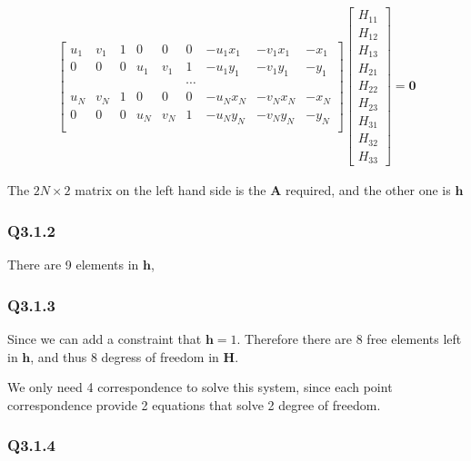 \documentclass[11pt]{article}
\begin{document}
\begin{align}
    \begin{bmatrix}
        u_{1} & v_{1} & 1 & 0 & 0 & 0 & -u_{1} x_{1} & -v_{1} x_{1} & -x_{1} \\
        0 & 0 & 0 & u_{1} & v_{1} & 1 & -u_{1} y_{1} & -v_{1} y_{1} & -y_{1} \\
        &&&&&\cdots &&& \\
        u_{N} & v_{N} & 1 & 0 & 0 & 0 & -u_{N} x_{N} & -v_{N} x_{N} & -x_{N} \\
        0 & 0 & 0 & u_{N} & v_{N} & 1 & -u_{N} y_{N} & -v_{N} y_{N} & -y_{N} \\
    \end{bmatrix}
    \begin{bmatrix}
        H_{11} \\ H_{12} \\ H_{13} \\
        H_{21} \\ H_{22} \\ H_{23} \\
        H_{31} \\ H_{32} \\ H_{33}
    \end{bmatrix}
    = \mathbf{0}
\end{align}

The $2N\times 2$ matrix on the left hand side is the $\mathbf{A}$ required, and the other one is $\mathbf{h}$

\newpage

\subsubsection*{Q3.1.2}

There are 9 elements in $\mathbf{h}$,

\newpage

\subsubsection*{Q3.1.3}

Since we can add a constraint that $\mathbf{h} = 1$. Therefore there are 8 free elements left in $\mathbf{h}$, and thus 8 degress of freedom in $\mathbf{H}$.

We only need 4 correspondence to solve this system, since each point correspondence provide 2 equations that solve 2 degree of freedom.

\newpage

\subsubsection*{Q3.1.4}
\end{document}
